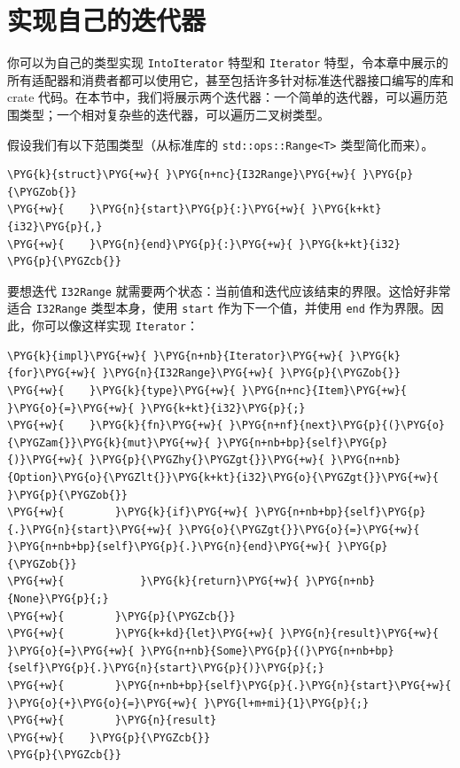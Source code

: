 \section{实现自己的迭代器}

你可以为自己的类型实现 \texttt{IntoIterator} 特型和 \texttt{Iterator} 特型，令本章中展示的所有适配器和消费者都可以使用它，甚至包括许多针对标准迭代器接口编写的库和 crate 代码。在本节中，我们将展示两个迭代器：一个简单的迭代器，可以遍历范围类型；一个相对复杂些的迭代器，可以遍历二叉树类型。

假设我们有以下范围类型（从标准库的 \texttt{std::ops::Range<T>} 类型简化而来）。

\begin{Verbatim}[commandchars=\\\{\},breaklines=true,breakanywhere=true,fontsize=\codefont,xleftmargin=17bp]
\PYG{k}{struct}\PYG{+w}{ }\PYG{n+nc}{I32Range}\PYG{+w}{ }\PYG{p}{\PYGZob{}}
\PYG{+w}{    }\PYG{n}{start}\PYG{p}{:}\PYG{+w}{ }\PYG{k+kt}{i32}\PYG{p}{,}
\PYG{+w}{    }\PYG{n}{end}\PYG{p}{:}\PYG{+w}{ }\PYG{k+kt}{i32}
\PYG{p}{\PYGZcb{}}
\end{Verbatim}

要想迭代 \texttt{I32Range} 就需要两个状态：当前值和迭代应该结束的界限。这恰好非常适合 \texttt{I32Range} 类型本身，使用 \texttt{start} 作为下一个值，并使用 \texttt{end} 作为界限。因此，你可以像这样实现 \texttt{Iterator}：

\begin{Verbatim}[commandchars=\\\{\},breaklines=true,breakanywhere=true,fontsize=\codefont,xleftmargin=17bp]
\PYG{k}{impl}\PYG{+w}{ }\PYG{n+nb}{Iterator}\PYG{+w}{ }\PYG{k}{for}\PYG{+w}{ }\PYG{n}{I32Range}\PYG{+w}{ }\PYG{p}{\PYGZob{}}
\PYG{+w}{    }\PYG{k}{type}\PYG{+w}{ }\PYG{n+nc}{Item}\PYG{+w}{ }\PYG{o}{=}\PYG{+w}{ }\PYG{k+kt}{i32}\PYG{p}{;}
\PYG{+w}{    }\PYG{k}{fn}\PYG{+w}{ }\PYG{n+nf}{next}\PYG{p}{(}\PYG{o}{\PYGZam{}}\PYG{k}{mut}\PYG{+w}{ }\PYG{n+nb+bp}{self}\PYG{p}{)}\PYG{+w}{ }\PYG{p}{\PYGZhy{}\PYGZgt{}}\PYG{+w}{ }\PYG{n+nb}{Option}\PYG{o}{\PYGZlt{}}\PYG{k+kt}{i32}\PYG{o}{\PYGZgt{}}\PYG{+w}{ }\PYG{p}{\PYGZob{}}
\PYG{+w}{        }\PYG{k}{if}\PYG{+w}{ }\PYG{n+nb+bp}{self}\PYG{p}{.}\PYG{n}{start}\PYG{+w}{ }\PYG{o}{\PYGZgt{}}\PYG{o}{=}\PYG{+w}{ }\PYG{n+nb+bp}{self}\PYG{p}{.}\PYG{n}{end}\PYG{+w}{ }\PYG{p}{\PYGZob{}}
\PYG{+w}{            }\PYG{k}{return}\PYG{+w}{ }\PYG{n+nb}{None}\PYG{p}{;}
\PYG{+w}{        }\PYG{p}{\PYGZcb{}}
\PYG{+w}{        }\PYG{k+kd}{let}\PYG{+w}{ }\PYG{n}{result}\PYG{+w}{ }\PYG{o}{=}\PYG{+w}{ }\PYG{n+nb}{Some}\PYG{p}{(}\PYG{n+nb+bp}{self}\PYG{p}{.}\PYG{n}{start}\PYG{p}{)}\PYG{p}{;}
\PYG{+w}{        }\PYG{n+nb+bp}{self}\PYG{p}{.}\PYG{n}{start}\PYG{+w}{ }\PYG{o}{+}\PYG{o}{=}\PYG{+w}{ }\PYG{l+m+mi}{1}\PYG{p}{;}
\PYG{+w}{        }\PYG{n}{result}
\PYG{+w}{    }\PYG{p}{\PYGZcb{}}
\PYG{p}{\PYGZcb{}}
\end{Verbatim}

